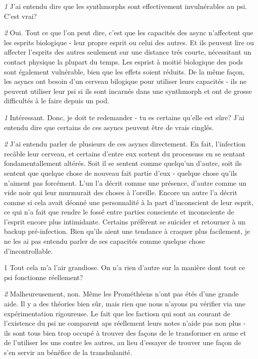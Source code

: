 \textit{\textit{1}} J'ai entendu dire que les synthmorphs sont effectivement invulnérables au psi. C'est vrai? 

\textit{\textit{2}} Oui. Tout ce que l'on peut dire, c'est que les capacités des async n'affectent que les esprits biologique - leur propre esprit ou celui des autres. Et ils peuvent lire ou affecter l'esprits des autres seulement sur une distance trés courte, nécessitant un contact physique la plupart du temps. Les esprist à moitié biologique des pods sont également vulnérable, bien que les effets soient réduits. De la même façon, les asyncs ont besoin d'un cerveau bilogique pour utiliser leurs capacités - ils ne peuvent utiliser leur psi si ils sont incarnés dans une synthmorph et ont de grosse difficultés à le faire depuis un pod. 

\textit{\textit{1}} Intéressant. Donc, je doit te redemander - tu es certaine qu'elle est sûre? J'ai entendu dire que certains de ces asyncs peuvent être de vrais cinglés. 

\textit{\textit{2}} J'ai entendu parler de plusieurs de ces asyncs directement. En fait, l'infection recâble leur cerveau, et certains d'entre eux sortent du processuss en se sentant fondamentallement altérés. Soit il se sentent comme quelqu'un d'autre, soit ils sentent que quelque chose de nouveau fait partie d'eux - quelque chose qu'ils n'aiment pas forcément. L'un l'a décrit comme une présence, d'autre comme un vide noir qui leur murmurait des choses à l'oreille. Encore un autre l'a décrit comme si cela avait déonné une personnalité à la part d'inconscient de leur esprit, ce qui n'a fait que rendre le fossé entre parties consciente et inconsciente de l'esprit encore plus intimidante. Certains préfèrent se suicider et retourner à un backup pré-infection. Bien qu'ils aient une tendance à craquer plus facilement, je ne les ai pas entendu parler de ses capacités comme quelque chose d'incontrollable. 

1 Tout cela m'a l'air grandiose. On n'a rien d'autre sur la manière dont tout ce psi fonctionne réellement? 

\textit{\textit{2}} Malheureusement, non. Même les Prométhéens n'ont pas étés d'une grande aide. Il y a des théories bien sûr, mais rien que nous n'ayons pu vérifier via une expérimentation rigoureuse. Le fait que les factiosn qui sont au courant de l'existence du psi ne comparent aps réellement leurs notes n'aide pas non plus - ils sont tous bien trop occupé à trouver des façons de le transformer en arme et de l'utiliser les uns contre les autres, au lieu d'essayer de trouver une façon de s'en servir au bénéfice de la transhulanité. 

